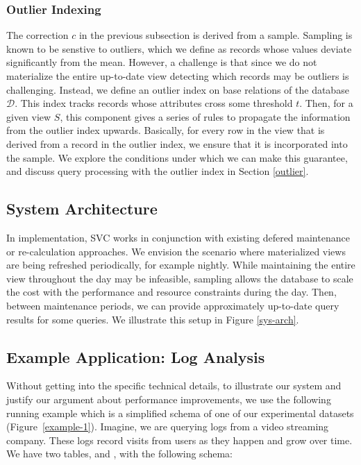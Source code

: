 \subsubsection{Outlier Indexing}
The correction $c$ in the previous subsection is derived from a sample.
Sampling is known to be senstive to outliers, which we define as records whose values deviate significantly from the mean.
However, a challenge is that since we do not materialize the entire up-to-date view detecting which records may be outliers is challenging.
Instead, we define an outlier index on base relations of the database $\mathcal{D}$.
This index tracks records whose attributes cross some threshold $t$.
Then, for a given view $S$, this component gives a series of rules to propagate the information from the outlier index upwards.
Basically, for every row in the view that is derived from a record in the outlier index, we ensure that it is incorporated into the sample.
We explore the conditions under which we can make this guarantee, and discuss query processing with the outlier index in Section \ref{outlier}.

\subsection{System Architecture}
In implementation, SVC works in conjunction with existing defered maintenance or re-calculation approaches.
We envision the scenario where materialized views are being refreshed periodically, for example nightly.
While maintaining the entire view throughout the day may be infeasible, sampling allows the database to scale the cost with the performance and resource constraints during the day.
Then, between maintenance periods, we can provide approximately up-to-date query results for some queries.
We illustrate this setup in Figure \ref{sys-arch}.

\subsection{Example Application: Log Analysis}
Without getting into the specific technical details, to illustrate our system and justify our argument about performance improvements, we use the following running example which is a 
simplified schema of one of our experimental datasets (Figure~\ref{example-1}).
Imagine, we are querying logs from a video streaming company. 
These logs record visits from users as they happen and grow over time.
We have two tables,  and , with the following schema:

